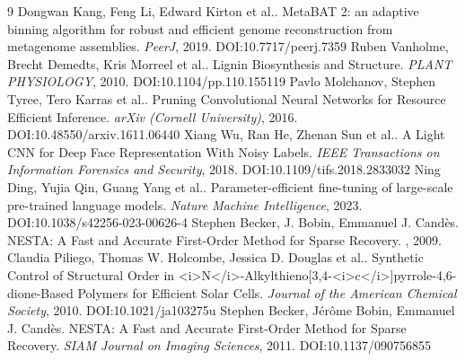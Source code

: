 \documentclass[11pt]{article}
\begin{document}
\begin{thebibliography}{9}
 Dongwan Kang, Feng Li, Edward Kirton et al.. MetaBAT 2: an adaptive binning algorithm for robust and efficient genome reconstruction from metagenome assemblies. \emph{PeerJ}, 2019. DOI:10.7717/peerj.7359
 Ruben Vanholme, Brecht Demedts, Kris Morreel et al.. Lignin Biosynthesis and Structure. \emph{PLANT PHYSIOLOGY}, 2010. DOI:10.1104/pp.110.155119
 Pavlo Molchanov, Stephen Tyree, Tero Karras et al.. Pruning Convolutional Neural Networks for Resource Efficient Inference. \emph{arXiv (Cornell University)}, 2016. DOI:10.48550/arxiv.1611.06440
 Xiang Wu, Ran He, Zhenan Sun et al.. A Light CNN for Deep Face Representation With Noisy Labels. \emph{IEEE Transactions on Information Forensics and Security}, 2018. DOI:10.1109/tifs.2018.2833032
 Ning Ding, Yujia Qin, Guang Yang et al.. Parameter-efficient fine-tuning of large-scale pre-trained language models. \emph{Nature Machine Intelligence}, 2023. DOI:10.1038/s42256-023-00626-4
 Stephen Becker, J. Bobin, Emmanuel J. Candès. NESTA: A Fast and Accurate First-Order Method for Sparse Recovery. \emph{}, 2009. 
 Claudia Piliego, Thomas W. Holcombe, Jessica D. Douglas et al.. Synthetic Control of Structural Order in <i>N</i>-Alkylthieno[3,4-<i>c</i>]pyrrole-4,6-dione-Based Polymers for Efficient Solar Cells. \emph{Journal of the American Chemical Society}, 2010. DOI:10.1021/ja103275u
 Stephen Becker, Jérôme Bobin, Emmanuel J. Candès. NESTA: A Fast and Accurate First-Order Method for Sparse Recovery. \emph{SIAM Journal on Imaging Sciences}, 2011. DOI:10.1137/090756855
\end{thebibliography}
\end{document}
